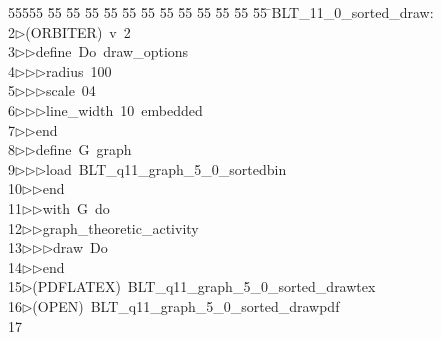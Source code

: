 %
%
\begin{tabbing}
55555 \= 55 \= 55 \= 55 \= 55 \= 55 \= 55 \= 55 \= 55 \= 55 \= 55 \= 55 \= 55 \= \>BLT\_11\_0\_sorted\_draw:\\[0pt]
2\>$\triangleright$\>(ORBITER)\ v\ 2\ \\[0pt]
3\>$\triangleright$\>$\triangleright$\>define\ Do\ draw\_options\ \\[0pt]
4\>$\triangleright$\>$\triangleright$\>$\triangleright$\>radius\ 100\ \\[0pt]
5\>$\triangleright$\>$\triangleright$\>$\triangleright$\>scale\ 04\ \\[0pt]
6\>$\triangleright$\>$\triangleright$\>$\triangleright$\>line\_width\ 10\ embedded\ \\[0pt]
7\>$\triangleright$\>$\triangleright$\>end\ \\[0pt]
8\>$\triangleright$\>$\triangleright$\>define\ G\ graph\ \\[0pt]
9\>$\triangleright$\>$\triangleright$\>$\triangleright$\>load\ BLT\_q11\_graph\_5\_0\_sortedbin\ \\[0pt]
10\>$\triangleright$\>$\triangleright$\>end\ \\[0pt]
11\>$\triangleright$\>$\triangleright$\>with\ G\ do\ \\[0pt]
12\>$\triangleright$\>$\triangleright$\>graph\_theoretic\_activity\ \\[0pt]
13\>$\triangleright$\>$\triangleright$\>$\triangleright$\>draw\ Do\ \\[0pt]
14\>$\triangleright$\>$\triangleright$\>end\\[0pt]
15\>$\triangleright$\>(PDFLATEX)\ BLT\_q11\_graph\_5\_0\_sorted\_drawtex\\[0pt]
16\>$\triangleright$\>(OPEN)\ BLT\_q11\_graph\_5\_0\_sorted\_drawpdf\\[0pt]
17\>\end{tabbing}
